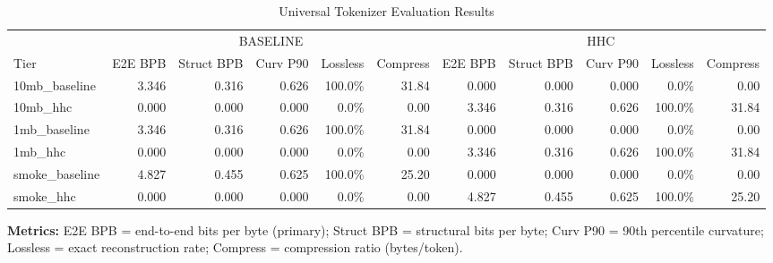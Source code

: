 
\begin{table}[htbp]
\centering
\caption{Universal Tokenizer Evaluation Results}
\label{tab:eval-matrix}
\begin{tabular}{lrrrrrrrrrr}
\toprule
 & \multicolumn{5}{c}{BASELINE} & \multicolumn{5}{c}{HHC} \\
\cmidrule(lr){2-6} \cmidrule(lr){7-11}
Tier & E2E BPB & Struct BPB & Curv P90 & Lossless & Compress & E2E BPB & Struct BPB & Curv P90 & Lossless & Compress \\
\midrule
10mb\_baseline & 3.346 & 0.316 & 0.626 & 100.0\% & 31.84 & 0.000 & 0.000 & 0.000 & 0.0\% & 0.00 \\
10mb\_hhc & 0.000 & 0.000 & 0.000 & 0.0\% & 0.00 & 3.346 & 0.316 & 0.626 & 100.0\% & 31.84 \\
1mb\_baseline & 3.346 & 0.316 & 0.626 & 100.0\% & 31.84 & 0.000 & 0.000 & 0.000 & 0.0\% & 0.00 \\
1mb\_hhc & 0.000 & 0.000 & 0.000 & 0.0\% & 0.00 & 3.346 & 0.316 & 0.626 & 100.0\% & 31.84 \\
smoke\_baseline & 4.827 & 0.455 & 0.625 & 100.0\% & 25.20 & 0.000 & 0.000 & 0.000 & 0.0\% & 0.00 \\
smoke\_hhc & 0.000 & 0.000 & 0.000 & 0.0\% & 0.00 & 4.827 & 0.455 & 0.625 & 100.0\% & 25.20 \\
\bottomrule
\end{tabular}
\vspace{1em}
\begin{minipage}{0.9\textwidth}
\footnotesize
\textbf{Metrics:} E2E BPB = end-to-end bits per byte (primary); Struct BPB = structural bits per byte; Curv P90 = 90th percentile curvature; Lossless = exact reconstruction rate; Compress = compression ratio (bytes/token).
\end{minipage}
\end{table}